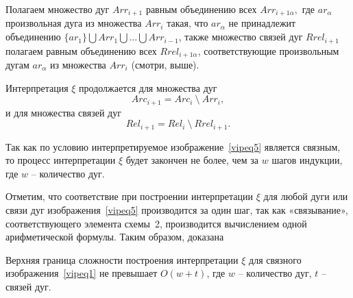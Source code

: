Полагаем множество дуг $Arr_{i+1}$ равным объединению всех $Arr_{i+1\alpha},$ где $ar_\alpha$ произвольная дуга из множества $Arr_i$ такая, что $ar_\alpha$ не принадлежит объединению 
$\{ar_1\} \bigcup Arr_1 \bigcup ... \bigcup Arr_{i-1}$, также множество связей дуг $Rrel_{i+1}$ полагаем равным объединению всех $Rrel_{i+1\alpha}$, соответствующие произвольным дугам $ar_\alpha$ из множества $Arr_i$ (смотри, выше).

Интерпретация  $\xi$ продолжается для множества дуг
$$Arc_{i+1} = Arc_i~\setminus~Arr_i,$$
и для множества  связей дуг
$$Rel_{i+1}=Rel_i~\setminus~Rrel_{i+1}.$$

Так как по условию интерпретируемое изображение~\ref{vipeq5} является  связным, то процесс интерпретации  $\xi$   будет закончен не более, чем за $w$  шагов индукции, где $w$ – количество дуг. 

Отметим, что соответствие при построении интерпретации $\xi$  для любой дуги или связи дуг изображения~\ref{vipeq5}  производится за  один шаг, так как «связывание», соответствующего элемента схемы~2,  производится вычислением одной арифметической формулы. Таким образом, доказана 
\begin{lemma}
Верхняя граница сложности построения интерпретации $\xi$ для связного изображения~\ref{vipeq1} не превышает $O(w+t)$, где  $w$ -- количество дуг, $t$ -- связей дуг.
\label{viplm1}
\end{lemma}

